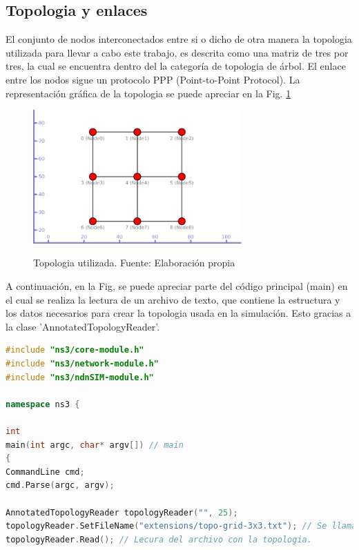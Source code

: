 \documentclass[12pt]{ociamthesis}  %
\begin{document}
\subsection{Topologia y enlaces}

El conjunto de nodos interconectados entre si o dicho de otra manera la topologia utilizada para llevar a cabo este trabajo, es descrita como una matriz de tres por tres, la cual se encuentra dentro del la categoría de topologia de árbol. El enlace entre los nodos sigue un protocolo PPP (Point-to-Point Protocol). La representación gráfica de la topologia se puede apreciar en la Fig. \ref{topologia_3x3_plugin}
                                                                                                                                                                                                                   
\begin{figure}[!htb]                                                                                  
	\centering                                                        
	\includegraphics[width=8cm]{Imagenes/Matriz3x3.pdf}\\                                                             
	\caption{Topologia utilizada. Fuente: Elaboración propia}                                                                                                                                                         
	\label{topologia_3x3_plugin}
\end{figure}

\pagebreak

A continuación, en la Fig, se puede apreciar parte del código principal (main) en el cual se realiza la lectura de un archivo de texto, que contiene la estructura y los datos necesarios para crear la topologia usada en la simulación. Esto gracias a la clase 'AnnotatedTopologyReader'.

\begin{lstlisting}[language=cpp,caption={Codigo fuente: main},label={codigo_topologia}]
#include "ns3/core-module.h"
#include "ns3/network-module.h"
#include "ns3/ndnSIM-module.h"

namespace ns3 {

int
main(int argc, char* argv[]) // main
{
CommandLine cmd;
cmd.Parse(argc, argv);

AnnotatedTopologyReader topologyReader("", 25); 
topologyReader.SetFileName("extensions/topo-grid-3x3.txt"); // Se llama al archivo 
topologyReader.Read(); // Lecura del archivo con la topologia.
\end{lstlisting}
\end{document}
